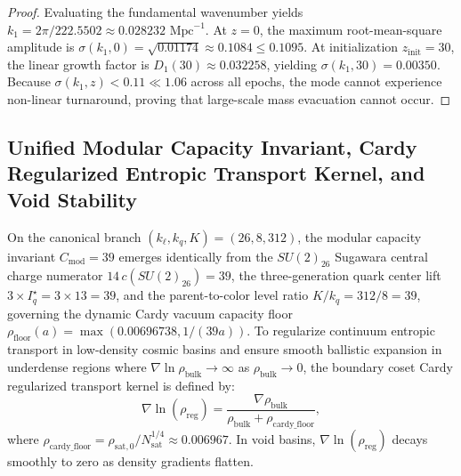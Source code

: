 \documentclass[11pt,letterpaper]{article}
\theoremstyle{plain}
\begin{document}
\begin{proof}
Evaluating the fundamental wavenumber yields $k_1 = 2\pi / 222.5502 \approx 0.028232 \text{ Mpc}^{-1}$. 
At $z = 0$, the maximum root-mean-square amplitude is $\sigma(k_1, 0) = \sqrt{0.01174} \approx 0.1084 \le 0.1095$. 
At initialization $z_{\text{init}} = 30$, the linear growth factor is $D_1(30) \approx 0.032258$, yielding 
$\sigma(k_1, 30) = 0.00350$. Because $\sigma(k_1, z) < 0.11 \ll 1.06$ across all epochs, 
the mode cannot experience non-linear turnaround, proving that large-scale mass evacuation 
cannot occur.
\end{proof}


\subsection{Unified Modular Capacity Invariant, Cardy Regularized Entropic Transport Kernel, and Void Stability}
On the canonical branch $(k_\ell, k_q, K) = (26, 8, 312)$, the modular capacity invariant $C_{\mathrm{mod}} = 39$ emerges identically from the $SU(2)_{26}$ Sugawara central charge numerator $14\,c(SU(2)_{26}) = 39$, the three-generation quark center lift $3\times I_q^\star = 3\times 13 = 39$, and the parent-to-color level ratio $K/k_q = 312/8 = 39$, governing the dynamic Cardy vacuum capacity floor $\rho_{\mathrm{floor}}(a) = \max(0.00696738, 1/(39a))$.
To regularize continuum entropic transport in low-density cosmic basins and ensure smooth ballistic expansion in underdense regions where $\nabla \ln \rho_{\mathrm{bulk}} \to \infty$ as $\rho_{\mathrm{bulk}} \to 0$, the boundary coset Cardy regularized transport kernel is defined by:
\begin{equation}
\nabla \ln(\rho_{\mathrm{reg}}) = \frac{\nabla \rho_{\mathrm{bulk}}}{\rho_{\mathrm{bulk}} + \rho_{\mathrm{cardy\_floor}}},
\end{equation}
where $\rho_{\mathrm{cardy\_floor}} = \rho_{\mathrm{sat},0} / N_{\mathrm{sat}}^{1/4} \approx 0.006967$. In void basins, $\nabla \ln(\rho_{\mathrm{reg}})$ decays smoothly to zero as density gradients flatten.
\end{document}
